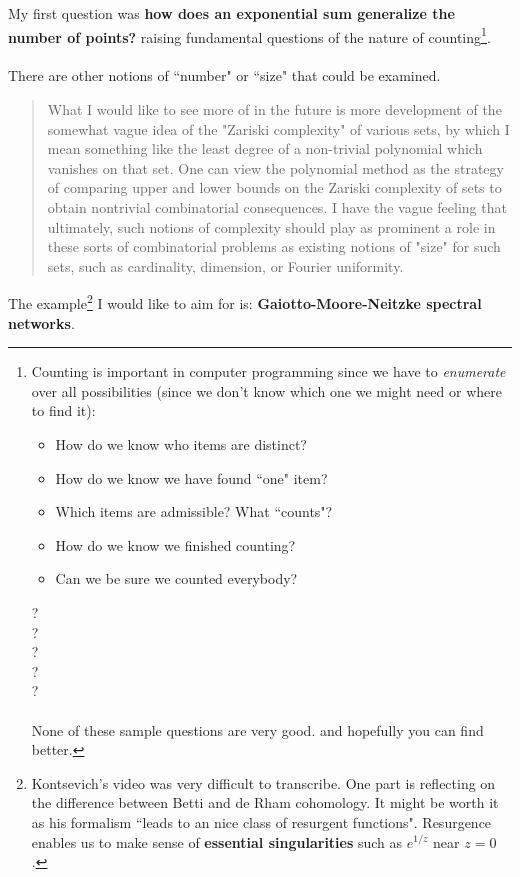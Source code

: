 \documentclass[12pt]{article}
\begin{document}
\noindent My first question was \textbf{how does an exponential sum generalize the number of points?} raising fundamental questions of the nature of counting\footnote{
Counting is important in computer programming since we have to \textit{enumerate} over all possibilities (since we don't know which one we might need or where to find it):
\begin{itemize}
\item How do we know who items are distinct?
\item How do we know we have found ``one" item?
\item Which items are admissible?  What ``counts"?
\item How do we know we finished counting? 
\item Can we be sure we counted everybody?
\end{itemize}
{\color{blue}{How many times do I stir a cup of coffee}}? \\ 
{\color{red}{How many minutes until the bus arrives}}? \\ 
{\color{blue}{Will I get a seat on the train}}? \\ 
{\color{red}{Where did I leave my keys}}? \\
{\color{blue}{What time is good for everybody}}? \\ \\
None of these sample questions are very good. and hopefully you can find better.  }. \\ \\
There are other notions of ``number" or ``size" that could be examined.  
\selectfont \fontsize{15}{20}\selectfont 
\begin{quotation}
What I would like to see more of in the future is more development of the somewhat vague idea of the "Zariski complexity" of various sets, by which I mean something like the least degree of a non-trivial polynomial which vanishes on that set. One can view the polynomial method as the strategy of comparing upper and lower bounds on the Zariski complexity of sets to obtain nontrivial combinatorial consequences. I have the vague feeling that ultimately, such notions of complexity should play as prominent a role in these sorts of combinatorial problems as existing notions of "size" for such sets, such as cardinality, dimension, or Fourier uniformity.
\end{quotation}
\selectfont \fontsize{25}{30}\selectfont
The example\footnote{Kontsevich's video was very difficult to transcribe.  One part is reflecting on the difference between Betti and de Rham cohomology.  It might be worth it as his formalism ``leads to an nice class of resurgent functions".  Resurgence enables us to make sense of \textbf{essential singularities} such as $e^{1/z}$ near $z = 0$.  } I would like to aim for is: \textbf{Gaiotto-Moore-Neitzke spectral networks}. \newpage
\end{document}
